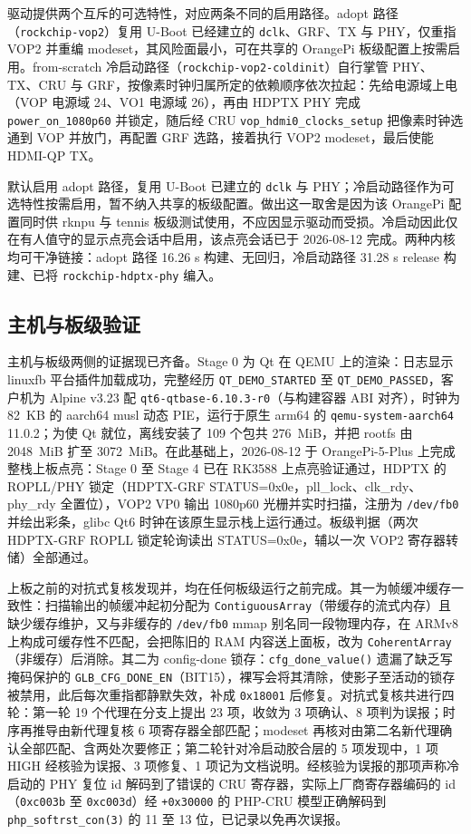 驱动提供两个互斥的可选特性，对应两条不同的启用路径。adopt 路径（\texttt{rockchip-vop2}）复用 U-Boot 已经建立的 \texttt{dclk}、GRF、TX 与 PHY，仅重指 VOP2 并重编 modeset，其风险面最小，可在共享的 OrangePi 板级配置上按需启用。from-scratch 冷启动路径（\texttt{rockchip-vop2-coldinit}）自行掌管 PHY、TX、CRU 与 GRF，按像素时钟归属所定的依赖顺序依次拉起：先给电源域上电（VOP 电源域 24、VO1 电源域 26），再由 HDPTX PHY 完成 \texttt{power\_on\_1080p60} 并锁定，随后经 CRU \texttt{vop\_hdmi0\_clocks\_setup} 把像素时钟选通到 VOP 并放门，再配置 GRF 选路，接着执行 VOP2 modeset，最后使能 HDMI-QP TX。

默认启用 adopt 路径，复用 U-Boot 已建立的 \texttt{dclk} 与 PHY；冷启动路径作为可选特性按需启用，暂不纳入共享的板级配置。做出这一取舍是因为该 OrangePi 配置同时供 rknpu 与 tennis 板级测试使用，不应因显示驱动而受损。冷启动因此仅在有人值守的显示点亮会话中启用，该点亮会话已于 2026-08-12 完成。两种内核均可干净链接：adopt 路径 16.26 s 构建、无回归，冷启动路径 31.28 s release 构建、已将 \texttt{rockchip-hdptx-phy} 编入。

\subsection{主机与板级验证}

主机与板级两侧的证据现已齐备。Stage 0 为 Qt 在 QEMU 上的渲染：日志显示 linuxfb 平台插件加载成功，完整经历 \texttt{QT\_DEMO\_STARTED} 至 \texttt{QT\_DEMO\_PASSED}，客户机为 Alpine v3.23 配 \texttt{qt6-qtbase-6.10.3-r0}（与构建容器 ABI 对齐），时钟为 82~KB 的 aarch64 musl 动态 PIE，运行于原生 arm64 的 \texttt{qemu-system-aarch64} 11.0.2；为使 Qt 就位，离线安装了 109 个包共 276~MiB，并把 rootfs 由 2048~MiB 扩至 3072~MiB。在此基础上，2026-08-12 于 OrangePi-5-Plus 上完成整栈上板点亮：Stage 0 至 Stage 4 已在 RK3588 上点亮验证通过，HDPTX 的 ROPLL/PHY 锁定（HDPTX-GRF STATUS=0x0e，pll\_lock、clk\_rdy、phy\_rdy 全置位），VOP2 VP0 输出 1080p60 光栅并实时扫描，注册为 \texttt{/dev/fb0} 并绘出彩条，glibc Qt6 时钟在该原生显示栈上运行通过。板级判据（两次 HDPTX-GRF ROPLL 锁定轮询读出 STATUS=0x0e，辅以一次 VOP2 寄存器转储）全部通过。

上板之前的对抗式复核发现并，均在任何板级运行之前完成。其一为帧缓冲缓存一致性：扫描输出的帧缓冲起初分配为 \texttt{ContiguousArray}（带缓存的流式内存）且缺少缓存维护，又与非缓存的 \texttt{/dev/fb0} mmap 别名同一段物理内存，在 ARMv8 上构成可缓存性不匹配，会把陈旧的 RAM 内容送上面板，改为 \texttt{CoherentArray}（非缓存）后消除。其二为 config-done 锁存：\texttt{cfg\_done\_value()} 遗漏了缺乏写掩码保护的 \texttt{GLB\_CFG\_DONE\_EN}（BIT15），裸写会将其清除，使影子至活动的锁存被禁用，此后每次重指都静默失效，补成 \texttt{0x18001} 后修复。对抗式复核共进行四轮：第一轮 19 个代理在分支上提出 23 项，收敛为 3 项确认、8 项判为误报；时序再推导由新代理复核 6 项寄存器全部匹配；modeset 再核对由第二名新代理确认全部匹配、含两处次要修正；第二轮针对冷启动胶合层的 5 项发现中，1 项 HIGH 经核验为误报、3 项修复、1 项记为文档说明。经核验为误报的那项声称冷启动的 PHY 复位 id 解码到了错误的 CRU 寄存器，实际上厂商寄存器编码的 id（\texttt{0xc003b} 至 \texttt{0xc003d}）经 \texttt{+0x30000} 的 PHP-CRU 模型正确解码到 \texttt{php\_softrst\_con(3)} 的 11 至 13 位，已记录以免再次误报。


